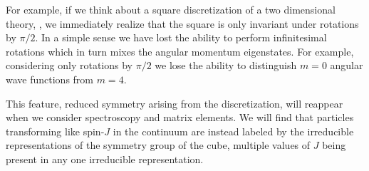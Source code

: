 For example, if we think about a square discretization of a two dimensional theory, , we immediately realize that the square is only invariant under rotations by $\pi/2$. In a simple sense we have lost the ability to perform infinitesimal rotations which in turn mixes the angular momentum eigenstates.  For example, considering only rotations by $\pi/2$ we lose the ability to distinguish $m=0$ angular wave functions from $m=4$. 
 
This feature, reduced symmetry arising from the discretization, will reappear when we consider spectroscopy and matrix elements. We will find that particles transforming like spin-$J$ in the continuum are instead labeled by the irreducible representations of the symmetry group of the cube, multiple values of $J$ being present in any one irreducible representation. 






















































